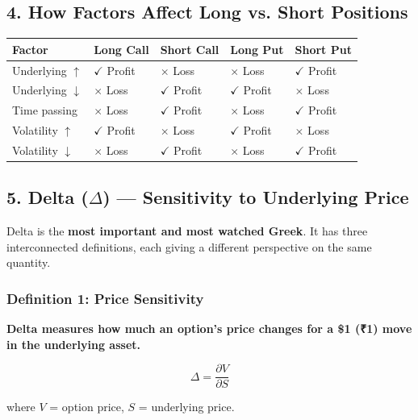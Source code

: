 \documentclass[12pt,openany]{book}
\begin{document}
\subsection{4. How Factors Affect Long vs. Short Positions}

\begin{center}
\scriptsize
\setlength{\tabcolsep}{3pt}
\begin{tabular}{|L{2.25cm}|L{2.25cm}|L{2.25cm}|L{2.25cm}|L{2.25cm}|}
\hline
\textbf{Factor} & \textbf{Long Call} & \textbf{Short Call} & \textbf{Long Put} & \textbf{Short Put} \\
\hline
Underlying \(\uparrow\) & \(\checkmark\) Profit & \(\times\) Loss & \(\times\) Loss & \(\checkmark\) Profit \\
\hline
Underlying \(\downarrow\) & \(\times\) Loss & \(\checkmark\) Profit & \(\checkmark\) Profit & \(\times\) Loss \\
\hline
Time passing & \(\times\) Loss & \(\checkmark\) Profit & \(\times\) Loss & \(\checkmark\) Profit \\
\hline
Volatility \(\uparrow\) & \(\checkmark\) Profit & \(\times\) Loss & \(\checkmark\) Profit & \(\times\) Loss \\
\hline
Volatility \(\downarrow\) & \(\times\) Loss & \(\checkmark\) Profit & \(\times\) Loss & \(\checkmark\) Profit \\
\hline
\end{tabular}
\end{center}

\subsection{5. Delta (\texorpdfstring{\(\Delta\)}{Delta}) — Sensitivity to Underlying Price}

Delta is the \textbf{most important and most watched Greek}. It has three interconnected definitions, each giving a different perspective on the same quantity.

\subsubsection{Definition 1: Price Sensitivity}

\textbf{Delta measures how much an option's price changes for a \$1 (₹1) move in the underlying asset.}

\[
\Delta = \frac{\partial V}{\partial S}
\]

where \(V\) = option price, \(S\) = underlying price.
\end{document}
